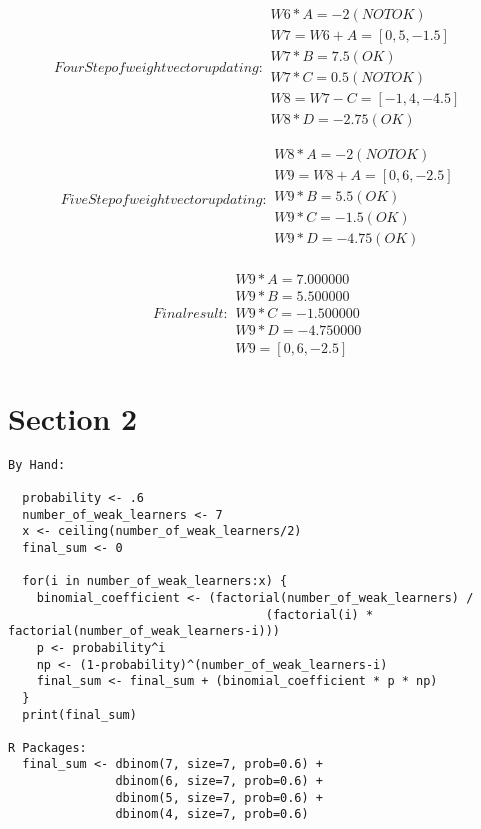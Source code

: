 \documentclass{report}
\begin{document}
\begin{subequations}
  Four Step of weight vector updating:
  \begin{flalign*}
    W6 * A = -2 (NOT OK) \\
    W7 = W6 + A = [0, 5, -1.5] \\
    W7 * B = 7.5 (OK) \\
    W7 * C = 0.5 (NOT OK) \\
    W8 = W7 - C = [-1, 4, -4.5] \\
    W8 * D = -2.75 (OK)
  \end{flalign*}
\end{subequations}

\begin{subequations}
  Five Step of weight vector updating:
  \begin{flalign*}
    W8 * A = -2 (NOT OK) \\
    W9 = W8 + A = [0, 6, -2.5] \\
    W9 * B = 5.5 (OK) \\
    W9 * C = -1.5 (OK) \\
    W9 * D = -4.75 (OK) \\
  \end{flalign*}
\end{subequations}

\begin{subequations}
  Final result:
  \begin{flalign*}
    W9 * A = 7.000000 \\
    W9 * B = 5.500000 \\
    W9 * C = -1.500000 \\
    W9 * D = -4.750000 \\
    W9 = [0, 6, -2.5]
  \end{flalign*}
\end{subequations}


\chapter{Section 2}

\begin{verbatim}
By Hand:

  probability <- .6
  number_of_weak_learners <- 7
  x <- ceiling(number_of_weak_learners/2)
  final_sum <- 0

  for(i in number_of_weak_learners:x) {
    binomial_coefficient <- (factorial(number_of_weak_learners) / 
                                    (factorial(i) * factorial(number_of_weak_learners-i)))
    p <- probability^i
    np <- (1-probability)^(number_of_weak_learners-i)
    final_sum <- final_sum + (binomial_coefficient * p * np)
  }
  print(final_sum)

R Packages:
  final_sum <- dbinom(7, size=7, prob=0.6) + 
               dbinom(6, size=7, prob=0.6) + 
               dbinom(5, size=7, prob=0.6) + 
               dbinom(4, size=7, prob=0.6)
\end{verbatim}
\end{document}
